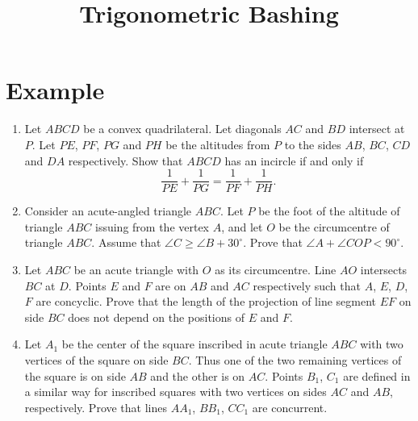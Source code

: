 \documentclass[12pt]{scrartcl}
\title{Trigonometric Bashing}
\begin{document}
\maketitle

\renewcommand*\contentsname{Daftar Isi}
\tableofcontents

\newpage

\section{Example}

\begin{enumerate}[label=E\arabic*.,leftmargin=*,itemsep=0.6em]

\item Let $ABCD$ be a convex quadrilateral. Let diagonals $AC$ and $BD$ intersect at $P$. Let $PE$, $PF$, $PG$ and $PH$ be the altitudes from $P$ to the sides $AB$, $BC$, $CD$ and $DA$ respectively. Show that $ABCD$ has an incircle if and only if
\[
\frac{1}{PE} + \frac{1}{PG} = \frac{1}{PF} + \frac{1}{PH}.
\]

\item Consider an acute-angled triangle $ABC$. Let $P$ be the foot of the altitude of triangle $ABC$ issuing from the vertex $A$, and let $O$ be the circumcentre of triangle $ABC$. Assume that $\angle C \ge \angle B + 30^\circ$. Prove that $\angle A + \angle COP < 90^\circ$.

\item Let $ABC$ be an acute triangle with $O$ as its circumcentre. Line $AO$ intersects $BC$ at $D$. Points $E$ and $F$ are on $AB$ and $AC$ respectively such that $A$, $E$, $D$, $F$ are concyclic. Prove that the length of the projection of line segment $EF$ on side $BC$ does not depend on the positions of $E$ and $F$.

\item Let $A_1$ be the center of the square inscribed in acute triangle $ABC$ with two vertices of the square on side $BC$. Thus one of the two remaining vertices of the square is on side $AB$ and the other is on $AC$. Points $B_1$, $C_1$ are defined in a similar way for inscribed squares with two vertices on sides $AC$ and $AB$, respectively. Prove that lines $AA_1$, $BB_1$, $CC_1$ are concurrent.


\end{enumerate}
\end{document}

